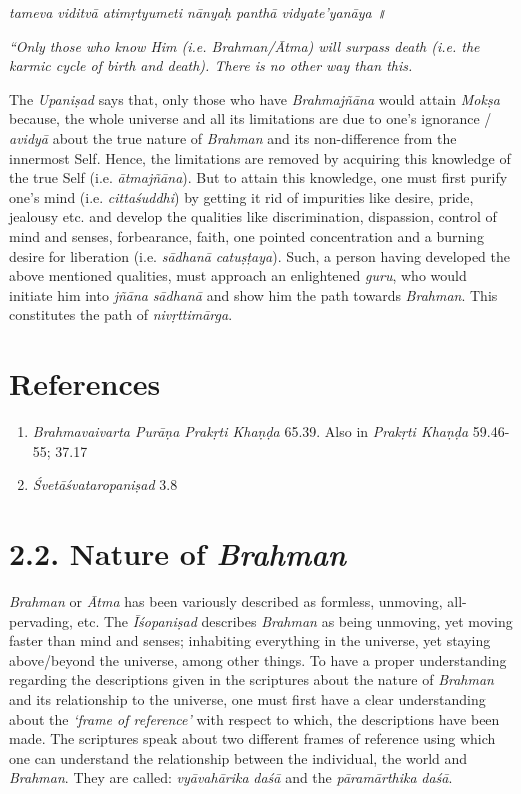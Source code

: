 \emph{tameva viditvā atimṛtyumeti nānyaḥ panthā vidyate'yanāya ॥}

\emph{``Only those who know Him (i.e. Brahman/Ātma) will surpass death (i.e. the karmic cycle of birth and death). There is no other way than this.}

The \emph{Upaniṣad} says that, only those who have \emph{Brahmajñāna} would attain \emph{Mokṣa} because, the whole universe and all its limitations are due to one's ignorance / \emph{avidyā} about the true nature of \emph{Brahman} and its non-difference from the innermost Self. Hence, the limitations are removed by acquiring this knowledge of the true Self (i.e. \emph{ātmajñāna}). But to attain this knowledge, one must first purify one's mind (i.e. \emph{cittaśuddhi}) by getting it rid of impurities like desire, pride, jealousy etc. and develop the qualities like discrimination, dispassion, control of mind and senses, forbearance, faith, one pointed concentration and a burning desire for liberation (i.e. \emph{sādhanā} \emph{catuṣṭaya}). Such, a person having developed the above mentioned qualities, must approach an enlightened \emph{guru}, who would initiate him into \emph{jñāna} \emph{sādhanā} and show him the path towards \emph{Brahman}. This constitutes the path of \emph{nivṛttimārga}.

\section*{References}

\begin{enumerate}
\item
  \emph{Brahmavaivarta Purāṇa Prakṛti Khaṇḍa} 65.39. Also in \emph{Prakṛti Khaṇḍa} 59.46-55; 37.17
\item
  \emph{Śvetāśvataropaniṣad} 3.8
\end{enumerate}

\section{2.2. Nature of \emph{Brahman}}

\emph{Brahman} or \emph{Ātma} has been variously described as formless, unmoving, all-pervading, etc. The \emph{Īśopaniṣad} describes \emph{Brahman} as being unmoving, yet moving faster than mind and senses; inhabiting everything in the universe, yet staying above/beyond the universe, among other things. To have a proper understanding regarding the descriptions given in the scriptures about the nature of \emph{Brahman} and its relationship to the universe, one must first have a clear understanding about the \emph{`frame of reference'} with respect to which, the descriptions have been made. The scriptures speak about two different frames of reference using which one can understand the relationship between the individual, the world and \emph{Brahman}. They are called: \emph{vyāvahārika} \emph{daśā} and the \emph{pāramārthika} \emph{daśā}.

